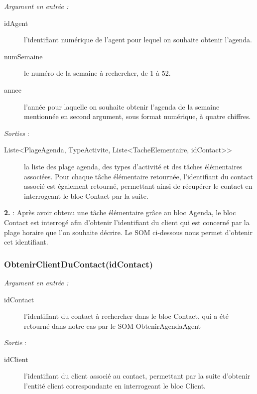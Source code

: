 \noindent \textit{Argument en entrée :}
\begin{description}
\item[idAgent] l'identifiant numérique de l'agent pour lequel on souhaite obtenir l'agenda. 
\item[numSemaine] le numéro de la semaine à rechercher, de 1 à 52. 
\item[annee] l'année pour laquelle on souhaite obtenir l'agenda de la semaine mentionnée en second argument, sous format numérique, à quatre chiffres. \\
\end{description}

\noindent \textit{Sorties} :
\begin{description}
\item[Liste<PlageAgenda, TypeActivite, Liste<TacheElementaire, idContact>>] la liste des plage agenda, des types d'activité et des tâches élémentaires associées. Pour chaque tâche élémentaire retournée, l'identifiant du contact associé est également retourné, permettant ainsi de récupérer le contact en interrogeant le bloc Contact par la suite. \\
\end{description}

\begin{shaded}
\textbf{2.} : Après avoir obtenu une tâche élémentaire grâce au bloc Agenda, le bloc Contact est interrogé afin d'obtenir l'identifiant du client qui est concerné par la plage horaire que l'on souhaite décrire. Le SOM ci-dessous nous permet d'obtenir cet identifiant.
\end{shaded}

\subsubsection{ObtenirClientDuContact(idContact)}

\noindent \textit{Argument en entrée :}
\begin{description}
\item[idContact] l'identifiant du contact à rechercher dans le bloc Contact, qui a été retourné dans notre cas par le SOM ObtenirAgendaAgent \\
\end{description}

\noindent \textit{Sortie} :
\begin{description}
\item[idClient] l'identifiant du client associé au contact, permettant par la suite d'obtenir l'entité client correspondante en interrogeant le bloc Client. \\
\end{description}

